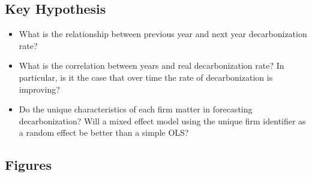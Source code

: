 \subsection{Key Hypothesis}
\begin{itemize}
    \item What is the relationship between previous year and next year decarbonization rate?
    \item What is the correlation between years and real decarbonization rate? In particular, is it the case that over time the rate of decarbonization is improving? 
    \item Do the unique characteristics of each firm matter in forecasting decarbonization? Will a mixed effect model using the unique firm identifier as a random effect be better than a simple OLS?
\end{itemize}





\subsection{Figures}

